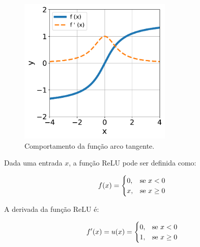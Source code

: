 \begin{figure}[H]
    \centering
    \includegraphics[width=0.65\textwidth]{figs/ann_arctan_function.pdf}

    \caption{Comportamento da função arco tangente.}
    \label{fig:ann_arctan_function}
\end{figure}


\linebreak
\newpage


\begin{definition}
    Dada uma entrada $x$, a função ReLU pode ser definida como:

    \begin{equation}
        f(x) =  
        \begin{cases}
            0, & \text{se $x < 0$}\\
            x, & \text{se $x \geq 0$}
        \end{cases}
        \vspace{0.2cm}
        \label{eq:ann_relu_function}
    \end{equation}

    A derivada da função ReLU é:

    \begin{equation}
        f'(x) = u(x) = 
        \begin{cases}
            0, & \text{se $x < 0$}\\
            1, & \text{se $x \geq 0$}
        \end{cases}
        \vspace{0.2cm}
        \label{eq:ann_relu_function_dy}
    \end{equation}

\end{definition}

